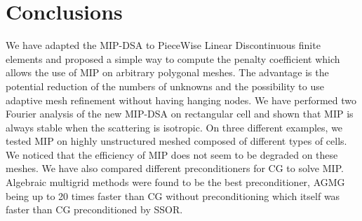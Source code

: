 \section{Conclusions} \label{sec_conc}
We have adapted the MIP-DSA to PieceWise Linear Discontinuous finite elements
and proposed a simple way to compute the penalty coefficient which allows the 
use of MIP on arbitrary polygonal meshes. The advantage is the potential 
reduction of the numbers of unknowns and the possibility to use adaptive mesh 
refinement without having hanging nodes. We have performed two Fourier analysis 
of the new MIP-DSA on rectangular cell and shown that MIP is always stable when 
the scattering is isotropic. On three different examples, we tested MIP on highly
unstructured meshed composed of different types of cells. We noticed that the
efficiency of MIP does not seem to be degraded on these meshes. We have also
compared different preconditioners for CG to solve MIP. Algebraic multigrid
methods were found to be the best preconditioner, AGMG being up to 20 times
faster than CG without preconditioning which itself was faster than CG
preconditioned by SSOR.
